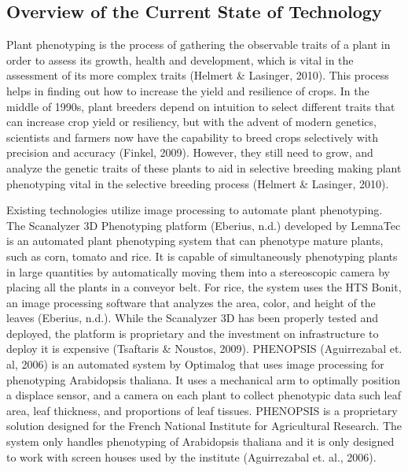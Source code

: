 %
%
%                 


\label{sec:researchdesc}

\subsection{Overview of the Current State of Technology}
\label{sec:overview}

Plant phenotyping is the process of gathering the observable traits of a plant in order to assess its growth, health and development, which is vital in the assessment of its more complex traits (Helmert & Lasinger, 2010). This process helps in finding out how to increase the yield and resilience of crops. In the middle of 1990s, plant breeders depend on intuition to select different traits that can increase crop yield or resiliency, but with the advent of  modern genetics, scientists and farmers now have the capability to breed crops selectively with precision and accuracy (Finkel, 2009). However, they still need to grow, and analyze the genetic traits of these plants to aid in selective breeding making plant phenotyping vital in the selective breeding process (Helmert & Lasinger, 2010).

	Existing technologies utilize image processing to automate plant phenotyping. The Scanalyzer 3D Phenotyping platform (Eberius, n.d.) developed by LemnaTec is an automated plant phenotyping system that can phenotype mature plants, such as corn, tomato and rice. It is capable of simultaneously phenotyping plants in large quantities by automatically moving them into a stereoscopic camera by placing all the plants in a conveyor belt. For rice, the system uses the HTS Bonit, an image processing software that analyzes the area, color, and height of the leaves (Eberius, n.d.). While the Scanalyzer 3D has been properly tested and deployed, the platform is proprietary and the investment on infrastructure to deploy it is expensive (Tsaftaris & Noustos, 2009). PHENOPSIS (Aguirrezabal et. al, 2006)  is an automated system by Optimalog that uses image processing for phenotyping Arabidopsis thaliana. It uses a mechanical arm to optimally position a displace sensor, and a camera on each plant to collect phenotypic data such leaf area, leaf thickness, and proportions of leaf tissues. PHENOPSIS is a proprietary solution designed for the French National Institute for Agricultural Research. The system only handles phenotyping of Arabidopsis thaliana and it is only designed to work with screen houses used by the institute (Aguirrezabal et. al., 2006).

